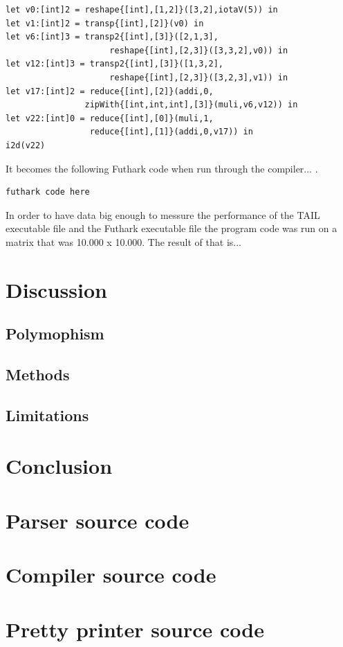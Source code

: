 \documentclass[11pt]{article}
\begin{document}
\begin{lstlisting}
let v0:[int]2 = reshape{[int],[1,2]}([3,2],iotaV(5)) in
let v1:[int]2 = transp{[int],[2]}(v0) in
let v6:[int]3 = transp2{[int],[3]}([2,1,3],
                     reshape{[int],[2,3]}([3,3,2],v0)) in
let v12:[int]3 = transp2{[int],[3]}([1,3,2],
                     reshape{[int],[2,3]}([3,2,3],v1)) in
let v17:[int]2 = reduce{[int],[2]}(addi,0,
                zipWith{[int,int,int],[3]}(muli,v6,v12)) in
let v22:[int]0 = reduce{[int],[0]}(muli,1,
                 reduce{[int],[1]}(addi,0,v17)) in
i2d(v22)
\end{lstlisting}

It becomes the following Futhark code when run through the compiler...
.
\begin{lstlisting}
futhark code here
\end{lstlisting}

In order to have data big enough to messure the performance of the TAIL executable file and the Futhark executable file the program code was run on a matrix that was 10.000 x 10.000. 
The result of that is...

\section{Discussion}

\subsection{Polymophism}
\subsection{Methods}
\subsection{Limitations}

\section{Conclusion}

{} 


\appendix
\section{Parser source code}
\label{app:parser}

\section{Compiler source code}
\label{app:compiler}

\section{Pretty printer source code}
\label{app:pretty}
\end{document}
